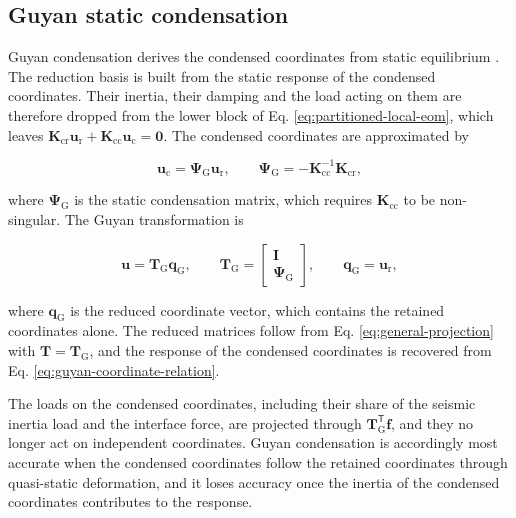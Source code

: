 \documentclass[a4paper,fleqn,review,12pt]{cas-sc}
\numberwithin{equation}{section}
\begin{document}
\subsection{Guyan static condensation} \label{sec21}

Guyan condensation derives the condensed coordinates from static equilibrium \cite{Guyan1965}. The reduction basis is built from the static response of the condensed coordinates. Their inertia, their damping and the load acting on them are therefore dropped from the lower block of Eq. \eqref{eq:partitioned-local-eom}, which leaves \(\mathbf{K}_{\mathrm{cr}}\bm{u}_{\mathrm{r}}+\mathbf{K}_{\mathrm{cc}}\bm{u}_{\mathrm{c}}=\bm{0}\). The condensed coordinates are approximated by

\vspace{-3.5em}
\begin{equation}
	\bm{u}_{\mathrm{c}}=\bm{\Psi}_{\mathrm{G}}\bm{u}_{\mathrm{r}},
	\qquad
	\bm{\Psi}_{\mathrm{G}}=-\mathbf{K}_{\mathrm{cc}}^{-1}\mathbf{K}_{\mathrm{cr}},
	\label{eq:guyan-coordinate-relation}
\end{equation}
\vspace{-3.5em}

\noindent where \(\bm{\Psi}_{\mathrm{G}}\) is the static condensation matrix, which requires \(\mathbf{K}_{\mathrm{cc}}\) to be non-singular.
The Guyan transformation is

\vspace{-3.5em}
\begin{equation}
	\bm{u}=\mathbf{T}_{\mathrm{G}}\bm{q}_{\mathrm{G}},
	\qquad
	\mathbf{T}_{\mathrm{G}}=
	\begin{bmatrix}
		\mathbf{I}\\
		\bm{\Psi}_{\mathrm{G}}
	\end{bmatrix},
	\qquad
	\bm{q}_{\mathrm{G}}=\bm{u}_{\mathrm{r}},
	\label{eq:guyan-transformation}
\end{equation}
\vspace{-3.5em}

\noindent where \(\bm{q}_{\mathrm{G}}\) is the reduced coordinate vector, which contains the retained coordinates alone. The reduced matrices follow from Eq. \eqref{eq:general-projection} with \(\mathbf{T}=\mathbf{T}_{\mathrm{G}}\), and the response of the condensed coordinates is recovered from Eq. \eqref{eq:guyan-coordinate-relation}.

The loads on the condensed coordinates, including their share of the seismic inertia load and the interface force, are projected through \(\mathbf{T}_{\mathrm{G}}^{\mathsf{T}}\bm{f}\), and they no longer act on independent coordinates. Guyan condensation is accordingly most accurate when the condensed coordinates follow the retained coordinates through quasi-static deformation, and it loses accuracy once the inertia of the condensed coordinates contributes to the response.
\end{document}
